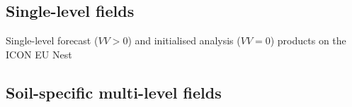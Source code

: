 \subsection{Single-level fields}

\renewcommand{\onlyglb}[1]{}
\renewcommand{\onlyloc}[1]{#1}
%
\begin{vartable}{\caption[]{Single-level forecast ($VV>0$) and initialised analysis ($VV=0$) products on the ICON EU Nest}}

  

\end{vartable}



\subsection{Soil-specific multi-level fields}


%
% 


